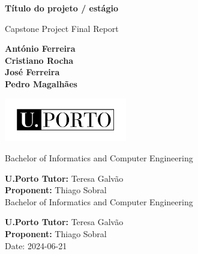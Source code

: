 \documentclass[10pt]{article}
\begin{document}
\begin{titlepage}
    \begin{center}
        \vspace*{1cm}
    {\fontsize{17}{16}\selectfont \textbf{Título do projeto / estágio}}

        \vspace{0.5cm}
        Capstone Project Final Report

        \vspace{1.5cm}

        \textbf{António Ferreira} \\
        \textbf{Cristiano Rocha} \\
        \textbf{José Ferreira} \\
        \textbf{Pedro Magalhães} \\

                \vfill

        \includegraphics[width=0.4\textwidth]{UPORTO_fundotransparente}

        \vfill

        Bachelor of Informatics and Computer Engineering

        \vspace{0.8cm}

        \textbf{U.Porto Tutor:} Teresa Galvão \\
        \textbf{Proponent:} Thiago Sobral \\

    Bachelor of Informatics and Computer Engineering \\
    \vspace{1cm}

    \textbf{U.Porto Tutor:} Teresa Galvão \\
    \textbf{Proponent:} Thiago Sobral \\

    \vspace{0.4cm}
        Date: 2024-06-21

    \end{center}
\end{titlepage}

\thispagestyle{empty}
\clearpage

\thispagestyle{empty}
\tableofcontents
\end{document}

